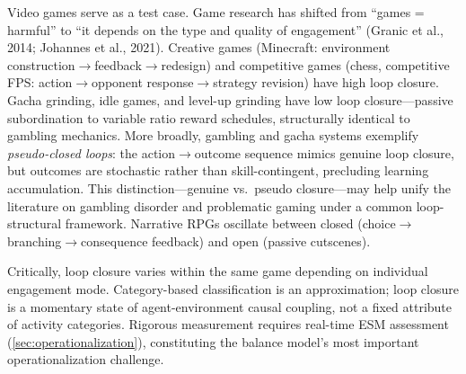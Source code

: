 \documentclass[a4paper,11pt,titlepage]{article}
\begin{document}
Video games serve as a test case. Game research has shifted from ``games = harmful'' to ``it depends on the type and quality of engagement'' (Granic et al., 2014; Johannes et al., 2021). Creative games (Minecraft: environment construction$\to$feedback$\to$redesign) and competitive games (chess, competitive FPS: action$\to$opponent response$\to$strategy revision) have high loop closure. Gacha grinding, idle games, and level-up grinding have low loop closure---passive subordination to variable ratio reward schedules, structurally identical to gambling mechanics. More broadly, gambling and gacha systems exemplify \emph{pseudo-closed loops}: the action$\to$outcome sequence mimics genuine loop closure, but outcomes are stochastic rather than skill-contingent, precluding learning accumulation. This distinction---genuine vs.\ pseudo closure---may help unify the literature on gambling disorder and problematic gaming under a common loop-structural framework. Narrative RPGs oscillate between closed (choice$\to$branching$\to$consequence feedback) and open (passive cutscenes).

Critically, loop closure varies within the same game depending on individual engagement mode. Category-based classification is an approximation; loop closure is a momentary state of agent-environment causal coupling, not a fixed attribute of activity categories. Rigorous measurement requires real-time ESM assessment (\cref{sec:operationalization}), constituting the balance model's most important operationalization challenge.
\end{document}
